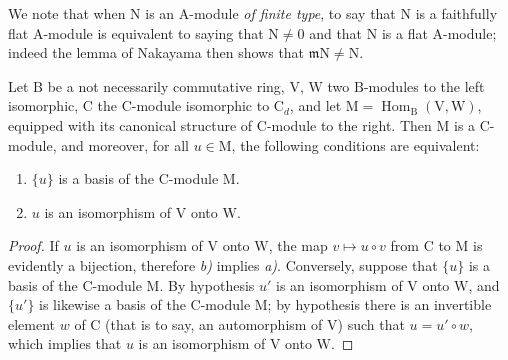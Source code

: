 \begin{remark}
\label{IV.2.5.4bis}
We note that when $\mathrm{N}$ is an $\mathrm{A}$-module \emph{of finite type},
to say that $\mathrm{N}$ is a faithfully flat $\mathrm{A}$-module is equivalent to saying that $\mathrm{N}\neq 0$ and that $\mathrm{N}$ is
a flat $\mathrm{A}$-module; indeed the lemma of Nakayama then shows that $\mathfrak{m}\mathrm{N}\neq\mathrm{N}$.
\end{remark}

\begin{lemma}[2.5.6]
\label{IV.2.5.6}
Let $\mathrm{B}$ be a not necessarily commutative ring, $\mathrm{V}$, $\mathrm{W}$ two $\mathrm{B}$-modules to the left isomorphic,
$\mathrm{C}$ the $\mathrm{C}$-module isomorphic to $\mathrm{C}_d$, and let $\mathrm{M}=\operatorname{Hom}_{\mathrm{B}}(\mathrm{V},\mathrm{W})$, equipped with its canonical structure of $\mathrm{C}$-module to the right. Then $\mathrm{M}$ is a $\mathrm{C}$-module, and moreover,
for all $u\in\mathrm{M}$, the following conditions are equivalent:
\begin{enumerate}[label=\emph{\alph*)}]
  \item $\{u\}$ is a basis of the $\mathrm{C}$-module $\mathrm{M}$.
  \item $u$ is an isomorphism of $\mathrm{V}$ onto $\mathrm{W}$.
\end{enumerate}
\end{lemma}

\begin{proof}
If $u$ is an isomorphism of $\mathrm{V}$ onto $\mathrm{W}$, the map $v\mapsto u\circ v$ from $\mathrm{C}$ to $\mathrm{M}$ is evidently a bijection,
therefore \emph{b)} implies \emph{a)}. Conversely, suppose that $\{u\}$ is a basis of the $\mathrm{C}$-module $\mathrm{M}$. By hypothesis
$u'$ is an isomorphism of $\mathrm{V}$ onto $\mathrm{W}$, and $\{u'\}$ is likewise a basis of the $\mathrm{C}$-module $\mathrm{M}$; by hypothesis
there is an invertible element $w$ of $\mathrm{C}$
(that is to say, an automorphism of $\mathrm{V}$) such that $u=u'\circ w$, which implies that $u$ is an isomorphism of $\mathrm{V}$ onto $\mathrm{W}$.
\end{proof}

